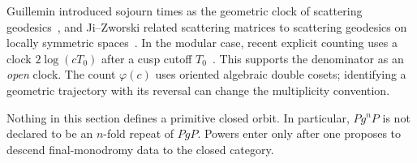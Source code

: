 Guillemin introduced sojourn times as the geometric clock of scattering
geodesics~\cite{Guillemin1976}, and Ji--Zworski related scattering matrices to
scattering geodesics on locally symmetric spaces~\cite{JiZworski2001}.  In
the modular case, recent explicit counting uses a clock
$2\log(cT_0)$ after a cusp cutoff $T_0$~\cite{PujahariSatpathy2025}.  This
supports the denominator as an \emph{open} clock.  The count
$\varphi(c)$ uses oriented algebraic double cosets; identifying a geometric
trajectory with its reversal can change the multiplicity convention.

Nothing in this section defines a primitive closed orbit.  In particular,
$Pg^nP$ is not declared to be an $n$-fold repeat of $PgP$.  Powers enter only
after one proposes to descend final-monodromy data to the closed category.
